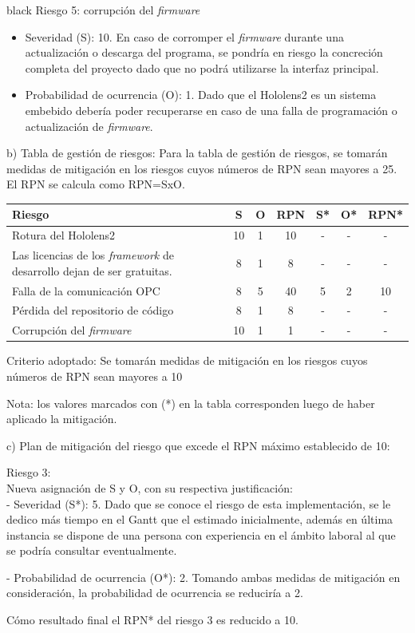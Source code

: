 \documentclass[11pt]{charter}
\begin{document}
\begin{consigna}{black}
Riesgo 5: corrupción del \textit{firmware}
\begin{itemize}
\item Severidad (S): 10. En caso de corromper el \textit{firmware} durante una actualización o descarga del programa, se pondría en riesgo la concreción completa del proyecto dado que no podrá utilizarse la interfaz principal.\\
\item Probabilidad de ocurrencia (O): 1. Dado que el Hololens2 es un sistema embebido debería poder recuperarse en caso de una falla de programación o actualización de \textit{firmware}.\\ 
\end{itemize}   

b) Tabla de gestión de riesgos:  
Para la tabla de gestión de riesgos, se tomarán medidas de mitigación en los riesgos cuyos
números de RPN sean mayores a 25. El RPN se calcula como RPN=SxO.

\begin{table}[htpb]
\centering
\begin{tabularx}{\linewidth}{@{}|X|c|c|c|c|c|c|@{}}
\hline
\rowcolor[HTML]{CBCEFB} 
Riesgo & S & O & RPN & S* & O* & RPN* \\ \hline
Rotura del Hololens2 & 10  & 1  &  10   &  -  &  -  &  -    \\ \hline
Las licencias de los \textit{framework} de desarrollo dejan de ser gratuitas. & 8 & 1  &  8   &  -  &  -  & - \\ \hline
Falla de la comunicación OPC       & 8  & 5 &  40   &  5  &  2  &   10   \\ \hline
Pérdida del repositorio de código       & 8 & 1 &  8   &  -  &  -  &  -    \\ \hline
Corrupción del \textit{firmware}       &  10  & 1 &  1   &  -  & -  & -     \\ \hline
\end{tabularx}%
\end{table}

Criterio adoptado: 
Se tomarán medidas de mitigación en los riesgos cuyos números de RPN sean mayores a 10

Nota: los valores marcados con (*) en la tabla corresponden luego de haber aplicado la mitigación.

c) Plan de mitigación del riesgo que excede el RPN máximo establecido de 10:
 
Riesgo 3:\\
Nueva asignación de S y O, con su respectiva justificación:\\

- Severidad (S*): 5. Dado que se conoce el riesgo de esta implementación, se le dedico más tiempo en el Gantt que el estimado inicialmente, además en última instancia se dispone de una persona con experiencia en el ámbito laboral al que se podría consultar eventualmente.

- Probabilidad de ocurrencia (O*): 2. Tomando ambas medidas de mitigación en consideración, la probabilidad de ocurrencia se reduciría a 2.

Cómo resultado final el RPN* del riesgo 3 es reducido a 10.

\end{consigna}
\end{document}
